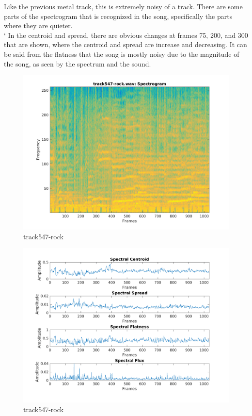 \documentclass[11pt, a4paper]{article}
\begin{document}
Like the previous metal track, this is extremely noisy of a track. There are some parts of the spectrogram that is recognized in the song, specifically the parts where they are quieter. \\
`
In the centroid and spread, there are obvious changes at frames 75, 200, and 300 that are shown, where the centroid and spread are increase and decreasing. It can be said from the flatness that the song is mostly noisy due to the magnitude of the song, as seen by the spectrum and the sound. \\

\pagebreak
\begin{figure}[H]
    \centering
    \includegraphics[width=.75\textwidth]{track547-rock-specto.png}
    \caption{track547-rock}
\end{figure}
\begin{figure}[H]
    \centering
    \includegraphics[width=1\textwidth]{track547-rock-spectral.png}
    \caption{track547-rock}
\end{figure}
\pagebreak 
\end{document}
